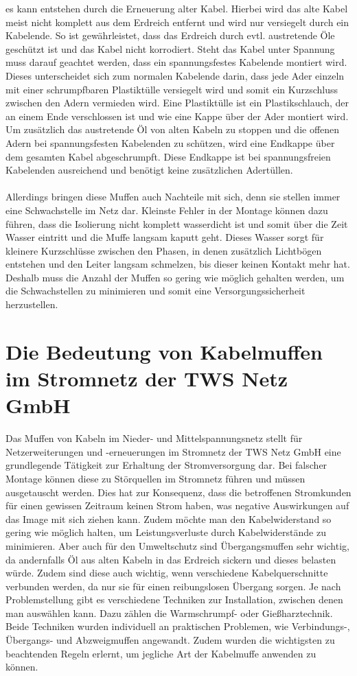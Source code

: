 es kann entstehen durch die Erneuerung alter Kabel. Hierbei wird das alte Kabel meist nicht komplett aus dem Erdreich entfernt und wird nur versiegelt durch 
ein Kabelende. So ist gewährleistet, dass das Erdreich durch evtl. austretende Öle geschützt ist und das Kabel nicht korrodiert. Steht das Kabel unter 
Spannung muss darauf geachtet werden, dass ein spannungsfestes Kabelende montiert wird. Dieses unterscheidet sich zum normalen Kabelende darin, dass jede 
Ader einzeln mit einer schrumpfbaren Plastiktülle versiegelt wird und somit ein Kurzschluss zwischen den Adern vermieden wird. Eine Plastiktülle ist ein 
Plastikschlauch, der an einem Ende verschlossen ist und wie eine Kappe über der Ader montiert wird. Um zusätzlich das austretende Öl von alten Kabeln zu 
stoppen und die offenen Adern bei \zB spannungsfesten Kabelenden zu schützen, wird eine Endkappe über dem gesamten Kabel abgeschrumpft. Diese Endkappe ist 
bei spannungsfreien Kabelenden ausreichend und benötigt keine zusätzlichen Adertüllen.
\\\\
Allerdings bringen diese Muffen auch Nachteile mit sich, denn sie stellen immer eine Schwachstelle im Netz dar. Kleinste Fehler in der Montage können dazu 
führen, dass die Isolierung nicht komplett wasserdicht ist und somit über die Zeit Wasser eintritt und die Muffe langsam kaputt geht. Dieses Wasser sorgt 
für kleinere Kurzschlüsse zwischen den Phasen, in denen zusätzlich Lichtbögen entstehen und den Leiter langsam schmelzen, bis dieser keinen Kontakt mehr hat. 
Deshalb muss die Anzahl der Muffen so gering wie möglich gehalten werden, um die Schwachstellen zu minimieren und somit eine Versorgungssicherheit 
herzustellen. 

\section{Die Bedeutung von Kabelmuffen im Stromnetz der TWS Netz GmbH}

Das Muffen von Kabeln im Nieder- und Mittelspannungsnetz stellt für Netzerweiterungen und -erneuerungen im Stromnetz der TWS Netz GmbH eine grundlegende 
Tätigkeit zur Erhaltung der Stromversorgung dar. Bei falscher Montage können diese zu Störquellen im Stromnetz führen und müssen ausgetauscht werden. Dies 
hat zur Konsequenz, dass die betroffenen Stromkunden für einen gewissen Zeitraum keinen Strom haben, was negative Auswirkungen auf das Image mit sich ziehen 
kann. Zudem möchte man den Kabelwiderstand so gering wie möglich halten, um Leistungsverluste durch Kabelwiderstände zu minimieren. Aber auch für den 
Umweltschutz sind \zB Übergangsmuffen sehr wichtig, da andernfalls Öl aus alten Kabeln in das Erdreich sickern und dieses belasten würde. Zudem sind diese 
auch wichtig, wenn verschiedene Kabelquerschnitte verbunden werden, da nur sie für einen reibungslosen Übergang sorgen. Je nach Problemstellung gibt es 
verschiedene Techniken zur Installation, zwischen denen man auswählen kann. Dazu zählen die Warmschrumpf- oder Gießharztechnik. Beide Techniken wurden 
individuell an praktischen Problemen, wie \zB Verbindungs-, Übergangs- und Abzweigmuffen angewandt. Zudem wurden die wichtigsten zu beachtenden Regeln 
erlernt, um jegliche Art der Kabelmuffe anwenden zu können.

\clearpage

\fi